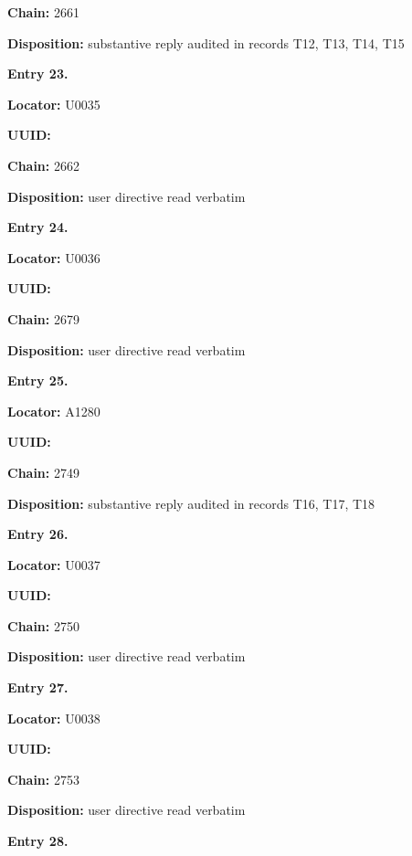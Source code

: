 \documentclass[10pt,a4paper,oneside]{report}
\begin{document}
\textbf{Chain:} 2661

\textbf{Disposition:} substantive reply audited in records T12, T13,
T14, T15


\textbf{Entry 23.}

\textbf{Locator:} U0035

\textbf{UUID:} \protect{}

\textbf{Chain:} 2662

\textbf{Disposition:} user directive read verbatim


\textbf{Entry 24.}

\textbf{Locator:} U0036

\textbf{UUID:} \protect{}

\textbf{Chain:} 2679

\textbf{Disposition:} user directive read verbatim


\textbf{Entry 25.}

\textbf{Locator:} A1280

\textbf{UUID:} \protect{}

\textbf{Chain:} 2749

\textbf{Disposition:} substantive reply audited in records T16, T17, T18


\textbf{Entry 26.}

\textbf{Locator:} U0037

\textbf{UUID:} \protect{}

\textbf{Chain:} 2750

\textbf{Disposition:} user directive read verbatim


\textbf{Entry 27.}

\textbf{Locator:} U0038

\textbf{UUID:} \protect{}

\textbf{Chain:} 2753

\textbf{Disposition:} user directive read verbatim


\textbf{Entry 28.}
\end{document}
